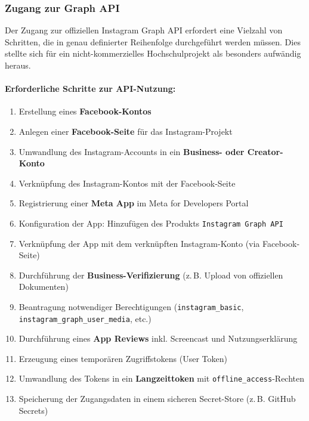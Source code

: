 \documentclass[a4paper,12pt]{article}
\begin{document}
\subsubsection{Zugang zur Graph API}

Der Zugang zur offiziellen Instagram Graph API erfordert eine Vielzahl von Schritten, die in genau definierter Reihenfolge durchgeführt werden müssen. Dies stellte sich für ein nicht-kommerzielles Hochschulprojekt als besonders aufwändig heraus.

\paragraph{Erforderliche Schritte zur API-Nutzung:}
\begin{enumerate}
    \item Erstellung eines \textbf{Facebook-Kontos}
    \item Anlegen einer \textbf{Facebook-Seite} für das Instagram-Projekt
    \item Umwandlung des Instagram-Accounts in ein \textbf{Business- oder Creator-Konto}
    \item Verknüpfung des Instagram-Kontos mit der Facebook-Seite
    \item Registrierung einer \textbf{Meta App} im Meta for Developers Portal
    \item Konfiguration der App: Hinzufügen des Produkts \texttt{Instagram Graph API}
    \item Verknüpfung der App mit dem verknüpften Instagram-Konto (via Facebook-Seite)
    \item Durchführung der \textbf{Business-Verifizierung} (z.\,B. Upload von offiziellen Dokumenten)
    \item Beantragung notwendiger Berechtigungen (\texttt{instagram\_basic}, \texttt{instagram\_graph\_user\_media}, etc.)
    \item Durchführung eines \textbf{App Reviews} inkl. Screencast und Nutzungserklärung
    \item Erzeugung eines temporären Zugriffstokens (User Token)
    \item Umwandlung des Tokens in ein \textbf{Langzeittoken} mit \texttt{offline\_access}-Rechten
    \item Speicherung der Zugangsdaten in einem sicheren Secret-Store (z.\,B. GitHub Secrets)
\end{enumerate}
\end{document}
